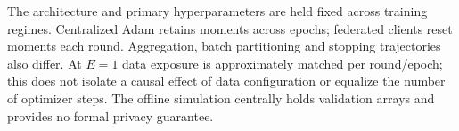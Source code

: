 \noindent The architecture and primary hyperparameters are held fixed across
training regimes. Centralized Adam retains moments across epochs; federated
clients reset moments each round. Aggregation, batch partitioning and stopping
trajectories also differ. At $E=1$ data exposure is approximately matched per
round/epoch; this does not isolate a causal effect of data configuration or
equalize the number of optimizer steps. The offline simulation centrally
holds validation arrays and provides no formal privacy guarantee.
